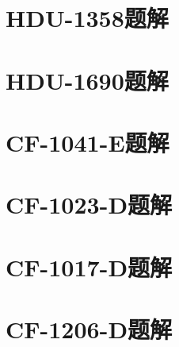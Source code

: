 

\section{HDU-1358题解}


\section{HDU-1690题解}


\section{CF-1041-E题解}


\section{CF-1023-D题解}


\section{CF-1017-D题解}


\section{CF-1206-D题解}


